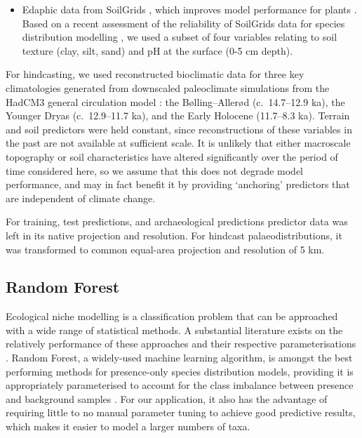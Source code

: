 \documentclass[
  authoryear,
  preprint]{elsarticle}
\providecommand{\tightlist}{%
  \setlength{\itemsep}{0pt}\setlength{\parskip}{0pt}}
\begin{document}
\begin{itemize}
\tightlist
\item
  Edaphic data from SoilGrids \citep{HenglEtAl2014, HenglEtAl2017},
  which improves model performance for plants
  \citep{DubuisEtAl2013, ModEtAl2016, VelazcoEtAl2017}. Based on a
  recent assessment of the reliability of SoilGrids data for species
  distribution modelling \citep{MillerEtAl2024}, we used a subset of
  four variables relating to soil texture (clay, silt, sand) and pH at
  the surface (0-5 cm depth).
\end{itemize}

For hindcasting, we used reconstructed bioclimatic data for three key
climatologies generated from downscaled paleoclimate simulations from
the HadCM3 general circulation model
\citep{FordhamEtAl2017, BrownEtAl2018}: the Bølling--Allerød
(c.~14.7--12.9 ka), the Younger Dryas (c.~12.9--11.7 ka), and the Early
Holocene (11.7--8.3 ka). Terrain and soil predictors were held constant,
since reconstructions of these variables in the past are not available
at sufficient scale. It is unlikely that either macroscale topography or
soil characteristics have altered significantly over the period of time
considered here, so we assume that this does not degrade model
performance, and may in fact benefit it by providing `anchoring'
predictors that are independent of climate change.

For training, test predictions, and archaeological predictions predictor
data was left in its native projection and resolution. For hindcast
palaeodistributions, it was transformed to common equal-area projection
and resolution of 5 km.

\subsection{Random Forest}\label{random-forest}

Ecological niche modelling is a classification problem that can be
approached with a wide range of statistical methods. A substantial
literature exists on the relatively performance of these approaches and
their respective parameterisations \citep[reviewed
in][]{ValaviEtAl2022}. Random Forest, a widely-used machine learning
algorithm, is amongst the best performing methods for presence-only
species distribution models, providing it is appropriately parameterised
to account for the class imbalance between presence and background
samples \citep{ValaviEtAl2021, ValaviEtAl2022}. For our application, it
also has the advantage of requiring little to no manual parameter tuning
to achieve good predictive results, which makes it easier to model a
larger numbers of taxa.
\end{document}
